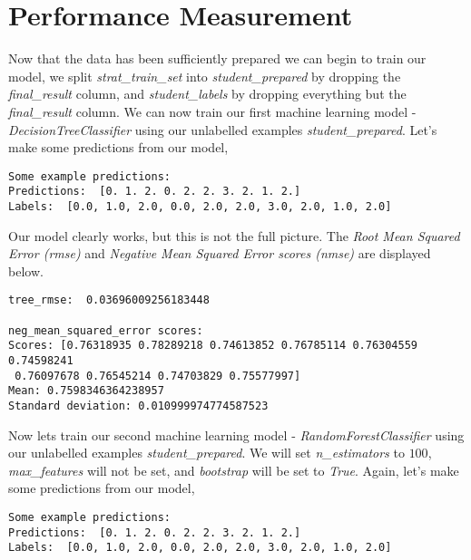 \documentclass[8pt]{article}
\begin{document}
\section{Performance Measurement}
Now that the data has been sufficiently prepared we can begin to train our model, we split \textit{strat\_train\_set} into \textit{student\_prepared} by dropping the \textit{final\_result} column, and \textit{student\_labels} by dropping everything but the \textit{final\_result} column. We can now train our first machine learning model - \textit{DecisionTreeClassifier} using our unlabelled examples \textit{student\_prepared}. Let's make some predictions from our model,
\newline
\newline
\begin{adjustbox}{max width=\textwidth}
\begin{lstlisting}
Some example predictions:
Predictions:  [0. 1. 2. 0. 2. 2. 3. 2. 1. 2.]
Labels:  [0.0, 1.0, 2.0, 0.0, 2.0, 2.0, 3.0, 2.0, 1.0, 2.0]
\end{lstlisting}
\end{adjustbox}
\newline
\newline
Our model clearly works, but this is not the full picture. The \textit{Root Mean Squared Error (rmse)} and \textit{Negative Mean Squared Error scores (nmse)} are displayed below.
\newline
\newline
\begin{adjustbox}{max width=\textwidth}
\begin{lstlisting}
tree_rmse:  0.03696009256183448

neg_mean_squared_error scores:
Scores: [0.76318935 0.78289218 0.74613852 0.76785114 0.76304559 0.74598241
 0.76097678 0.76545214 0.74703829 0.75577997]
Mean: 0.7598346364238957
Standard deviation: 0.010999974774587523
 \end{lstlisting}
\end{adjustbox}
\newline
\newline
Now lets train our second machine learning model - \textit{RandomForestClassifier} using our unlabelled examples \textit{student\_prepared}. We will set \textit{n\_estimators} to $100$, \textit{max\_features} will not be set, and \textit{bootstrap} will be set to \textit{True}. Again, let's make some predictions from our model,
\newline
\newline
\begin{adjustbox}{max width=\textwidth}
\begin{lstlisting}
Some example predictions:
Predictions:  [0. 1. 2. 0. 2. 2. 3. 2. 1. 2.]
Labels:  [0.0, 1.0, 2.0, 0.0, 2.0, 2.0, 3.0, 2.0, 1.0, 2.0]
\end{lstlisting}
\end{adjustbox}
\end{document}
